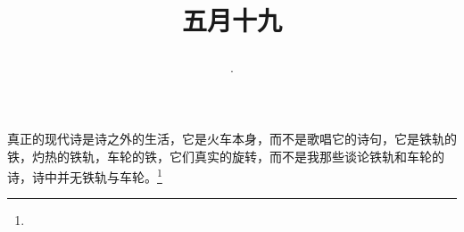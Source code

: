 \title{\date[d=24,m=6,y=2024][year:cn-y,年,month:cn,day:cn,日,·,weekday]·五月十九 }
真正的现代诗是诗之外的生活，它是火车本身，而不是歌唱它的诗句，它是铁轨的铁，灼热的铁轨，车轮的铁，它们真实的旋转，而不是我那些谈论铁轨和车轮的诗，诗中并无铁轨与车轮。\footnote{ }

